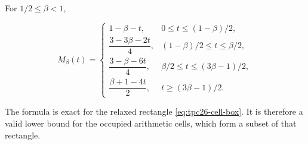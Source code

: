 \begin{proposition}
\label{prop:tpc26-sharp-minimax}
For \(1/2\le\beta<1\),

\begin{equation}
 \boxed{
 M_\beta(t)=
 \begin{cases}
 1-\beta-t,
 &0\le t\le(1-\beta)/2,\\[3pt]
 \dfrac{3-3\beta-2t}{4},
 &(1-\beta)/2\le t\le\beta/2,\\[6pt]
 \dfrac{3-\beta-6t}{4},
 &\beta/2\le t\le(3\beta-1)/2,\\[6pt]
 \dfrac{\beta+1-4t}{2},
 &t\ge(3\beta-1)/2.
 \end{cases}}
 \label{eq:tpc26-sharp-minimax}
\end{equation}

The formula is exact for the relaxed rectangle
\eqref{eq:tpc26-cell-box}.  It is therefore a valid lower bound for
the occupied arithmetic cells, which form a subset of that rectangle.
\end{proposition}

